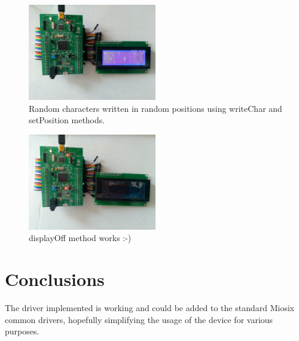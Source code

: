 \documentclass[12pt]{article}
\begin{document}
\begin{figure}[H]
\centering
\includegraphics[width=0.5\textwidth, angle=90]{foto_random_char.jpg}
\caption{\label{fig:}Random characters written in random positions using writeChar and setPosition methods.}
\end{figure}

\begin{figure}[H]
\centering
\includegraphics[width=0.5\textwidth, angle=90]{foto_off.jpg}
\caption{\label{fig:}displayOff method works :-)}
\end{figure}

\vfill

\section{Conclusions}
The driver implemented is working and could be added to the standard Miosix common drivers, hopefully simplifying the usage of the device for various purposes.
\end{document}
